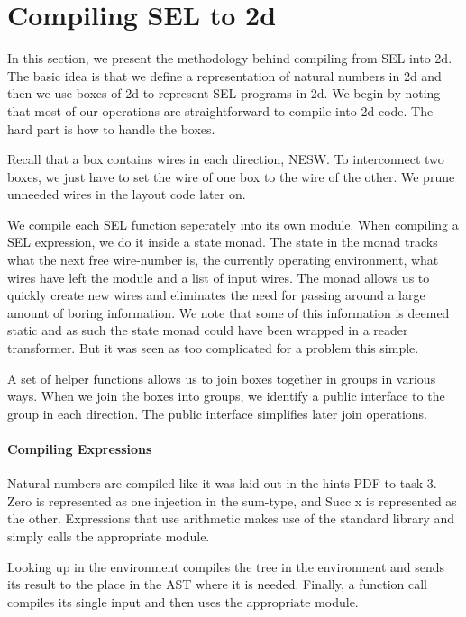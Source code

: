 
\section{Compiling SEL to 2d}
\label{sec:compiling-sel-2d}

In this section, we present the methodology behind compiling from SEL
into 2d. The basic idea is that we define a representation of natural
numbers in 2d and then we use boxes of 2d to represent SEL programs in
2d. We begin by noting that most of our operations are straightforward
to compile into 2d code. The hard part is how to handle the boxes.

Recall that a box contains wires in each direction, NESW. To
interconnect two boxes, we just have to set the wire of one box to the
wire of the other. We prune unneeded wires in the layout code later
on.

We compile each SEL function seperately into its own module. When
compiling a SEL expression, we do it inside a state monad. The state
in the monad tracks what the next free wire-number is, the currently
operating environment, what wires have left the module and a list of
input wires. The monad allows us to quickly create new wires and
eliminates the need for passing around a large amount of boring
information. We note that some of this information is deemed static
and as such the state monad could have been wrapped in a reader
transformer. But it was seen as too complicated for a problem this
simple.

A set of helper functions allows us to join boxes together in groups
in various ways. When we join the boxes into groups, we identify a
public interface to the group in each direction. The public interface
simplifies later join operations.


\paragraph{Compiling Expressions}
\label{sec:compiling-numbers}

Natural numbers are compiled like it was laid out in the hints PDF to
task 3. Zero is represented as one injection in the sum-type, and Succ
x is represented as the other. Expressions that use arithmetic makes
use of the standard library and simply calls the appropriate module.

Looking up in the environment compiles the tree in the environment and
sends its result to the place in the AST where it is needed. Finally,
a function call compiles its single input and then uses the
appropriate module.

